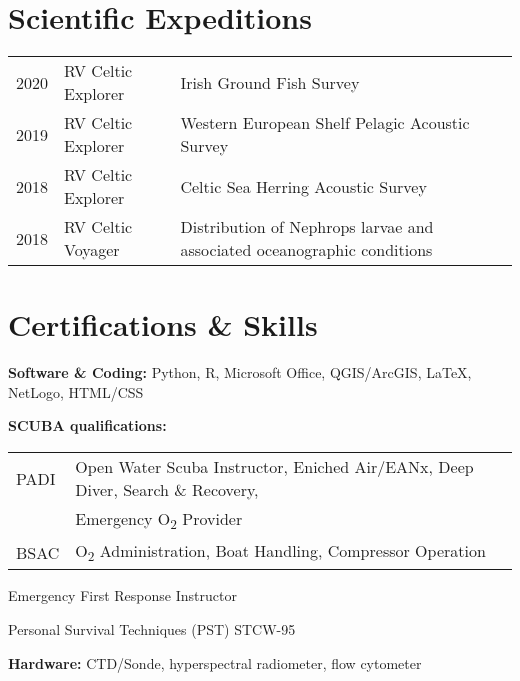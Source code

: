 \documentclass[a4paper]{deedy-resume} %
\begin{document}
\begin{flushleft}
\begin{tabular}{ l l l }
\end{tabular}

\sectionspace %



\sectionspace %

\section{Scientific Expeditions}

\begin{tabular}{l l l}
2020 & RV Celtic Explorer & Irish Ground Fish Survey \\
2019 & RV Celtic Explorer & Western European Shelf Pelagic Acoustic Survey \\
2018 & RV Celtic Explorer & Celtic Sea Herring Acoustic Survey \\
2018 & RV Celtic Voyager & Distribution of Nephrops larvae and associated oceanographic conditions \\
\end{tabular}

\sectionspace %

\end{flushleft}



\section{Certifications \& Skills}
\sectionspace

\begin{tightitemize}
\item \textbf{Software \& Coding:} Python, R, Microsoft Office, QGIS/ArcGIS, \LaTeX, NetLogo, HTML/CSS
\item \textbf{SCUBA qualifications:} \\
\begin{tabular}{ l l }
PADI & Open Water Scuba Instructor, Eniched Air/EANx, Deep Diver, Search \& Recovery, \\
 & Emergency O\textsubscript{2} Provider \\
BSAC & O\textsubscript{2} Administration, Boat Handling, Compressor Operation
\end{tabular}
\item Emergency First Response Instructor
\item Personal Survival Techniques (PST) STCW-95
\item \textbf{Hardware:} CTD/Sonde, hyperspectral radiometer, flow cytometer
\end{tightitemize}

\sectionspace %


\end{document}
